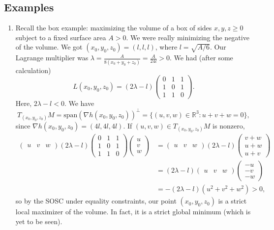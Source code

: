 \documentclass[11pt]{article}
\newcommand{\R}{\mathbb{R}}
\begin{document}
\subsection{Examples}

\begin{enumerate}
\item
Recall the box example: maximizing the volume of a box of sides $x,y,z\geq 0$ subject to a fixed surface area $A > 0$. We were really minimizing the negative of the volume. We got $(x_0,y_0,z_0) = (l,l,l)$, where $l = \sqrt{A/6}$. Our Lagrange multiplier was $\lambda = \frac{A}{8(x_0+y_0+z_0)} = \frac{A}{24 l} > 0$. We had (after some calculation)
\[
L(x_0,y_0,z_0) = (2\lambda - l)\begin{pmatrix}
0&1&1 \\
1&0&1 \\
1&1&0
\end{pmatrix}.
\]
Here, $2\lambda - l < 0$. We have 
\[
T_{(x_0,y_0,z_0)}M = \mathrm{span}( \nabla h(x_0,y_0,z_0) )^\perp = \{ (u,v,w) \in \R^3 : u+v+w=0 \},
\]
since $\nabla h(x_0,y_0,z_0) = (4l,4l,4l)$. If $(u,v,w) \in T_{(x_0,y_0,z_0)}M$ is nonzero,
\begin{align*}
\begin{pmatrix}
u&v&w
\end{pmatrix}(2\lambda - l)\begin{pmatrix}
0&1&1 \\
1&0&1 \\
1&1&0
\end{pmatrix} \begin{pmatrix}
u\\v\\w
\end{pmatrix} &= \begin{pmatrix}
u&v&w
\end{pmatrix}(2\lambda - l) \begin{pmatrix}
v+w \\ u+w \\ u+v
\end{pmatrix} \\
&= (2\lambda - l)\begin{pmatrix}
u&v&w
\end{pmatrix} \begin{pmatrix}
-u \\ -v \\ -w
\end{pmatrix} \\
&= -(2\lambda - l)(u^2+v^2+w^2) > 0,
\end{align*}
so by the SOSC under equality constraints, our point $(x_0,y_0,z_0)$ is a strict local maximizer of the volume. In fact, it is a strict global minimum (which is yet to be seen).


\end{enumerate}
\end{document}
